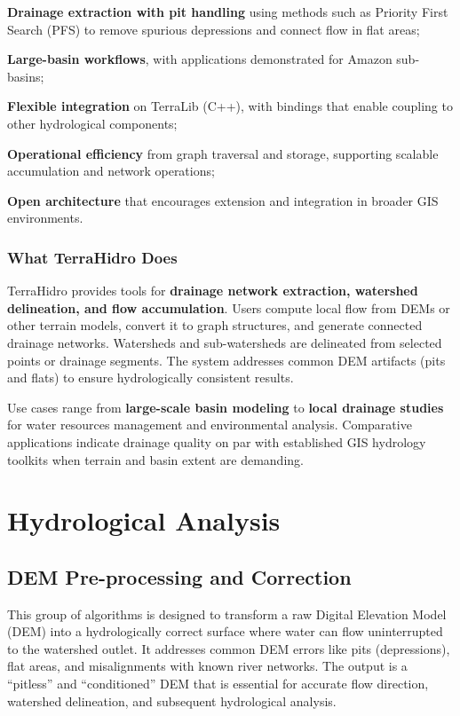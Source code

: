 \documentclass[
]{book}
\theoremstyle{definition}
\theoremstyle{definition}
\theoremstyle{definition}
\theoremstyle{definition}
\theoremstyle{remark}
\begin{document}
\textbf{Drainage extraction with pit handling} using methods such as Priority First Search (PFS) to remove spurious depressions and connect flow in flat areas;

\textbf{Large-basin workflows}, with applications demonstrated for Amazon sub-basins;

\textbf{Flexible integration} on TerraLib (C++), with bindings that enable coupling to other hydrological components;

\textbf{Operational efficiency} from graph traversal and storage, supporting scalable accumulation and network operations;

\textbf{Open architecture} that encourages extension and integration in broader GIS environments.

\subsection*{What TerraHidro Does}\label{what-terrahidro-does}

TerraHidro provides tools for \textbf{drainage network extraction, watershed delineation, and flow accumulation}. Users compute local flow from DEMs or other terrain models, convert it to graph structures, and generate connected drainage networks. Watersheds and sub-watersheds are delineated from selected points or drainage segments. The system addresses common DEM artifacts (pits and flats) to ensure hydrologically consistent results.

Use cases range from \textbf{large-scale basin modeling} to \textbf{local drainage studies} for water resources management and environmental analysis. Comparative applications indicate drainage quality on par with established GIS hydrology toolkits when terrain and basin extent are demanding.

\chapter{Hydrological Analysis}\label{hydrological-analysis}

\section{DEM Pre-processing and Correction}\label{DEM-Pre-processing-and-Correction}

This group of algorithms is designed to transform a raw Digital Elevation Model (DEM) into a hydrologically correct surface where water can flow uninterrupted to the watershed outlet. It addresses common DEM errors like pits (depressions), flat areas, and misalignments with known river networks. The output is a ``pitless'' and ``conditioned'' DEM that is essential for accurate flow direction, watershed delineation, and subsequent hydrological analysis.
\end{document}
